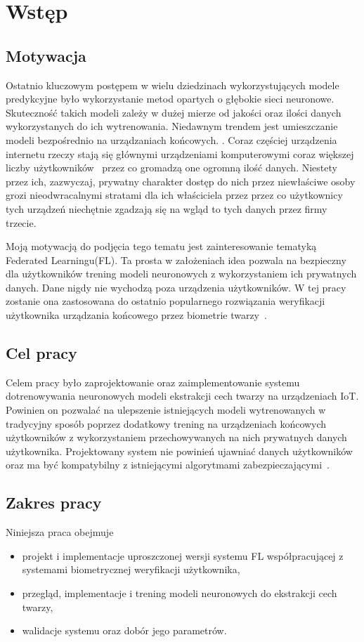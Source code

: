 \newpage
\section{Wstęp}

\subsection{Motywacja}

Ostatnio kluczowym postępem w wielu dziedzinach wykorzystujących modele predykcyjne było
wykorzystanie metod opartych o głębokie sieci neuronowe. Skuteczność takich modeli zależy w dużej
mierze od jakości oraz ilości danych wykorzystanych do ich wytrenowania. Niedawnym trendem jest
umieszczanie modeli bezpośrednio na urządzaniach końcowych. \cite{EdgeFacebook}. Coraz częściej urządzenia internetu rzeczy stają się głównymi urządzeniami komputerowymi coraz większej liczby
użytkowników~\cite{SmartphoneOwenrship,SmartphoneOwenrshipv2} przez co gromadzą one ogromną ilość
danych. Niestety przez ich, zazwyczaj, prywatny charakter dostęp do nich przez niewłaściwe osoby grozi nieodwracalnymi stratami dla ich właściciela przez przez co użytkownicy tych urządzeń niechętnie zgadzają się na wgląd to tych danych przez firmy trzecie.

Moją motywacją do podjęcia tego tematu jest zainteresowanie tematyką Federated Learningu(FL). Ta
prosta w założeniach idea pozwala na bezpieczny dla użytkowników trening modeli neuronowych z
wykorzystaniem ich prywatnych danych. Dane nigdy nie wychodzą poza urządzenia użytkowników. W
tej pracy zostanie ona zastosowana do ostatnio popularnego rozwiązania weryfikacji użytkownika
urządzania końcowego przez biometrie twarzy~\cite{FaceBiometic}.


\subsection{Cel pracy}
Celem pracy było zaprojektowanie oraz zaimplementowanie systemu dotrenowywania neuronowych modeli ekstrakcji cech twarzy na urządzeniach IoT. Powinien on pozwalać na ulepszenie istniejących modeli wytrenowanych w tradycyjny sposób poprzez dodatkowy trening na urządzeniach końcowych użytkowników z wykorzystaniem przechowywanych na nich prywatnych danych użytkownika. Projektowany system nie powinień ujawniać danych użytkowników oraz ma być kompatybilny z istniejącymi algorytmami zabezpieczającymi~\cite{FLSecureAggregation}.

\subsection{Zakres pracy}
Niniejsza praca obejmuje
\begin{itemize}
    \item  projekt i implementacje uproszczonej wersji systemu FL współpracującej z systemami biometrycznej weryfikacji użytkownika,
    \item przegląd, implementacje i trening modeli neuronowych do ekstrakcji cech twarzy,
    \item walidacje systemu oraz dobór jego parametrów.
\end{itemize}

